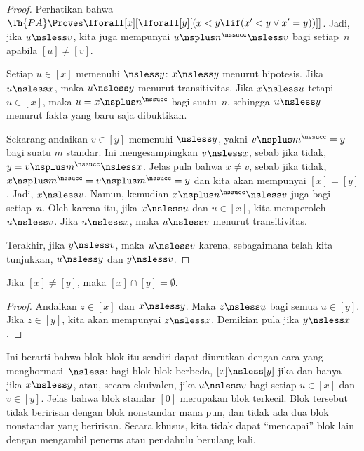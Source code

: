 \documentclass[../../../include/open-logic-section]{subfiles}
\begin{document}
\begin{proof}
Perhatikan bahwa $\Th{PA} \Proves \lforall[x][\lforall[y][(x < y \lif
(x' < y \lor x' = y))]]$. Jadi, jika $u \nsless v$, kita juga mempunyai
$u \nsplus n^\nssucc \nsless v$ bagi setiap~$n$ apabila
$[u] \neq [v]$.

Setiap $u \in [x]$ memenuhi $\nsless y$: $x \nsless y$ menurut hipotesis.
Jika $u \nsless x$, maka $u \nsless y$ menurut transitivitas. Jika
$x \nsless u$ tetapi $u \in [x]$, maka
$u = x\nsplus n^\nssucc$ bagi suatu~$n$, sehingga $u \nsless y$ menurut
fakta yang baru saja dibuktikan.

Sekarang andaikan $v \in [y]$ memenuhi $\nsless y$, yakni
$v \nsplus m^\nssucc = y$ bagi suatu $m$ standar. Ini mengesampingkan
$v \nsless x$, sebab jika tidak, $y = v \nsplus m^\nssucc \nsless x$.
Jelas pula bahwa $x \neq v$, sebab jika tidak,
$x \nsplus m^\nssucc = v \nsplus m^\nssucc = y$ dan kita akan mempunyai
$[x] = [y]$. Jadi, $x \nsless v$. Namun, kemudian
$x \nsplus n^\nssucc \nsless v$ juga bagi setiap~$n$. Oleh karena itu,
jika $x \nsless u$ dan $u \in [x]$, kita memperoleh $u \nsless v$. Jika
$u \nsless x$, maka $u \nsless v$ menurut transitivitas.

Terakhir, jika $y \nsless v$, maka $u \nsless v$ karena, sebagaimana telah
kita tunjukkan, $u \nsless y$ dan $y \nsless v$.
\end{proof}

\begin{cor}
Jika $[x] \neq [y]$, maka $[x] \cap [y] = \emptyset$.
\end{cor}

\begin{proof}
Andaikan $z \in [x]$ dan $x \nsless y$. Maka $z \nsless u$ bagi semua
$u \in [y]$. Jika $z \in [y]$, kita akan mempunyai $z \nsless z$.
Demikian pula jika $y \nsless x$.
\end{proof}

\begin{explain}
Ini berarti bahwa blok-blok itu sendiri dapat diurutkan dengan cara yang
menghormati~$\nsless$: bagi blok-blok berbeda, $[x] \nsless [y]$ jika dan
hanya jika $x \nsless y$, atau, secara ekuivalen, jika
$u \nsless v$ bagi setiap $u \in [x]$ dan $v \in [y]$. Jelas bahwa blok
standar $[0]$ merupakan blok terkecil. Blok tersebut tidak beririsan dengan
blok nonstandar mana pun, dan tidak ada dua blok nonstandar yang beririsan.
Secara khusus, kita tidak dapat ``mencapai'' blok lain dengan mengambil
penerus atau pendahulu berulang kali.
\end{explain}
\end{document}
